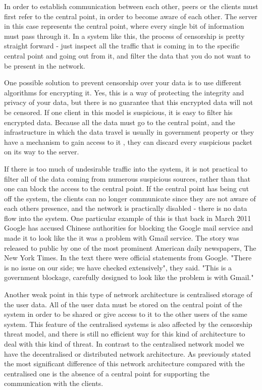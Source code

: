 In order to establish communication between each other, peers or the clients must first refer to the central point, in order to become aware of each other. The server in this case represents the central point, where every single bit of information must pass through it. In a system like this, the process of censorship is pretty straight forward - just inspect all the traffic that is coming in to the specific central point and going out from it, and filter the data that you do not want to be present in the network. 

One possible solution to prevent censorship over your data is to use different algorithms for encrypting it. Yes, this is a way of protecting the integrity and privacy of your data, but there is no guarantee that this encrypted data will not be censored. If one client in this model is suspicious, it is easy to filter his encrypted data. Because all the data must go to the central point, and the infrastructure in which the data travel is usually in government property or they have a mechanism to gain access to it \cite{dianotti2011}, they can discard every suspicious packet on its way to the server.

If there is too much of undesirable traffic into the system, it is not practical to filter all of the data coming from numerous suspicious sources, rather than that one can block the access to the central point. If the central point has being cut off the system, the clients can no longer communicate since they are not aware of each others presence, and the network is practically disabled - there is no data flow into the system. One particular example of this is that back in March 2011 Google has accused Chinese authorities for blocking the Google mail service and made it to look like the it was a problem with Gmail service. The story was released to public by one of the most prominent American daily newspapers, The New York Times. In the text there were official statements from Google. "There is no issue on our side; we have checked extensively", they said. "This is a government blockage, carefully designed to look like the problem is with Gmail." \cite{web:newyorktimes}

Another weak point in this type of network architecture is centralised storage of the user data. All of the user data must be stored on the central point of the system in order to be shared or give access to it to the other users of the same system. This feature of the centralised systems is also affected by the censorship threat model, and there is still no efficient way for this kind of architecture to deal with this kind of threat.
In contrast to the centralised network model we have the decentralised or distributed network architecture. As previously stated the most significant difference of this network architecture compared with the centralised one is the absence of a central point for supporting the communication with the clients. 

